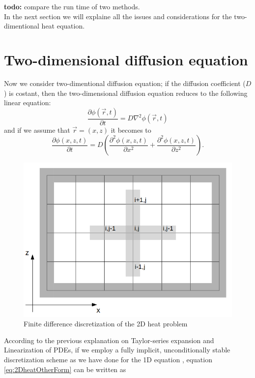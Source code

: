 \textbf{todo:} compare the run time of two methods.
\\

In the next section we will explaine all the issues and considerations for the two-dimentional heat equation.\\
\section{Two-dimensional diffusion equation}
Now we consider two-dimentional diffusion equation; if the diffusion coefficient ($D$) is costant, then  the two-dimensional diffusion equation reduces to the following linear equation:
\begin{equation}
\label{eq:2Dheat}
\frac{\partial \phi(\vec{r},t)}{\partial t}= D \nabla^2 \phi(\vec{r},t)
\end{equation}
and if we assume that $\vec{r}=(x,z)$ it becomes to
\begin{equation}
\label{eq:2DheatOtherForm}
\frac{\partial \phi(x,z,t)}{\partial t}= D \left( \frac{\partial ^2 \phi(x,z,t)}{\partial x^2} +\frac{\partial ^2 \phi(x,z,t)}{\partial z^2} \right).
\end{equation}

\begin{figure}[ht]\centering
\includegraphics[width=\linewidth]{2d-grid}
\caption{Finite difference discretization of the 2D heat problem}
\label{fig:2d-grid}
\end{figure}

According to the previous explanation on Taylor-series expansion and Linearization of PDEs, if we employ a fully implicit, unconditionally stable discretization scheme as we have done for the 1D equation , equation \ref{eq:2DheatOtherForm} can be written as

